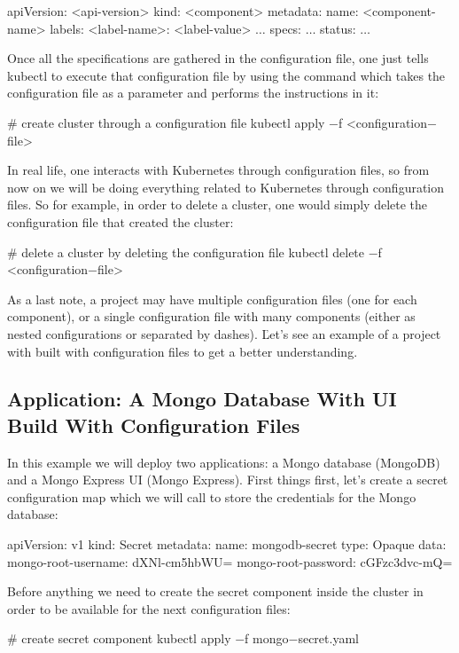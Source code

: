 \begin{block}
apiVersion: <api-version>
kind: <component>
metadata:
    name: <component-name>
    labels:
        <label-name>: <label-value>
    $\dots$
specs:
    $\dots$
status:
    $\dots$
\end{block}

Once all the specifications are gathered in the configuration file, one just tells kubectl to execute that configuration
file by using the  command which takes the configuration file as a parameter and performs the
instructions in it:
\begin{bash}
# create cluster through a configuration file
kubectl apply $-$f <configuration$-$file>
\end{bash}

In real life, one interacts with Kubernetes through configuration files, so from now on we will be doing everything
related to Kubernetes through configuration files. So for example, in order to delete a cluster, one would simply
delete the configuration file that created the cluster:
\begin{bash}
# delete a cluster by deleting the configuration file
kubectl delete $-$f <configuration$-$file>
\end{bash}

As a last note, a project may have multiple configuration files (one for each component), or a single configuration file
with many components (either as nested configurations or separated by dashes). \v

Let's see an example of a project with built with configuration files to get a better understanding.

\subsection*{Application: A Mongo Database With UI Build With Configuration Files}

In this example we will deploy two applications: a Mongo database (MongoDB) and a Mongo Express UI (Mongo Express).
First things first, let's create a secret configuration map which we will call  to store the
credentials for the Mongo database:
\begin{block}
apiVersion: v1
kind: Secret
metadata:
    name: mongodb-secret
type: Opaque
data:
    mongo-root-username: dXNl-cm5hbWU=
    mongo-root-password: cGFzc3dvc-mQ=
\end{block}

Before anything we need to create the secret component inside the cluster in order to be available for the next
configuration files:
\begin{bash}
# create secret component
kubectl apply $-$f mongo$-$secret.yaml
\end{bash}

